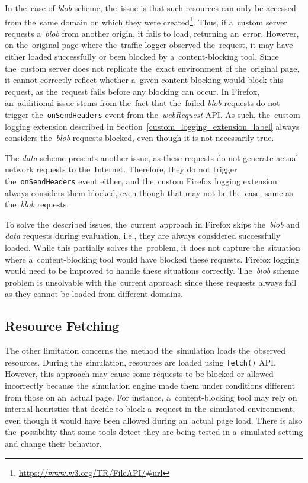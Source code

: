 In the~case of \textit{blob} scheme, the~issue is that such resources can only be accessed from the~same domain on which they were created\footnote{\url{https://www.w3.org/TR/FileAPI/\#url}}. Thus, if a~custom server requests a~\textit{blob} from another origin, it fails to load, returning an~error. However, on the~original page where the~traffic logger observed the~request, it may have either loaded successfully or been blocked by a~content-blocking tool. Since the~custom server does not replicate the~exact environment of the~original page, it cannot correctly reflect whether a~given content-blocking would block this request, as the~request fails before any blocking can occur. In Firefox, an~additional issue stems from the~fact that the~failed \textit{blob} requests do not trigger the~\texttt{onSendHeaders} event from the~\textit{webRequest} API. As such, the~custom logging extension described in Section~\ref{custom_logging_extension_label} always considers the~\textit{blob} requests blocked, even though it is not necessarily true.

The \textit{data} scheme presents another issue, as these requests do not generate actual network requests to the~Internet. Therefore, they do not trigger the~\texttt{onSendHeaders} event either, and the~custom Firefox logging extension always considers them blocked, even though that may not be the~case, same as the~\textit{blob} requests.

To solve the~described issues, the~current approach in Firefox skips the~\emph{blob} and \emph{data} requests during evaluation, i.e., they are always considered successfully loaded. While this partially solves the~problem, it does not capture the~situation where a~content-blocking tool would have blocked these requests. Firefox logging would need to be improved to handle these situations correctly. The~\textit{blob} scheme problem is unsolvable with the~current approach since these requests always fail as they cannot be loaded from different domains.

\subsection{Resource Fetching}
\label{simulation_limits}
The other limitation concerns the~method the~simulation loads the~observed resources. During the~simulation, resources are loaded using \texttt{fetch()} API. However, this approach may cause some requests to be blocked or allowed incorrectly because the~simulation engine made them under conditions different from those on an~actual page. For instance, a~content-blocking tool may rely on internal heuristics that decide to block a~request in the~simulated environment, even though it would have been allowed during an~actual page load. There is also the~possibility that some tools detect they are being tested in a~simulated setting and change their behavior.

